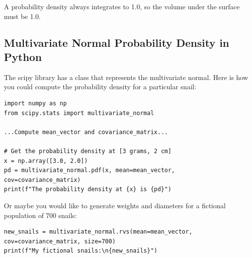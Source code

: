 A probability density always integrates to 1.0, so the volume under the surface must be 1.0.

\subsection{Multivariate Normal Probability Density in Python}

The scipy library has a class that represents the multivariate normal. Here is how you could compute the probability density for a particular snail:

\begin{verbatim}
import numpy as np
from scipy.stats import multivariate_normal

...Compute mean_vector and covariance_matrix...

# Get the probability density at [3 grams, 2 cm]
x = np.array([3.0, 2.0])
pd = multivariate_normal.pdf(x, mean=mean_vector, cov=covariance_matrix)
print(f"The probability density at {x} is {pd}")
\end{verbatim}

Or maybe you would like to generate weights and diameters for a fictional population of 700 snails:

\begin{verbatim}
new_snails = multivariate_normal.rvs(mean=mean_vector, cov=covariance_matrix, size=700)
print(f"My fictional snails:\n{new_snails}")
\end{verbatim}
